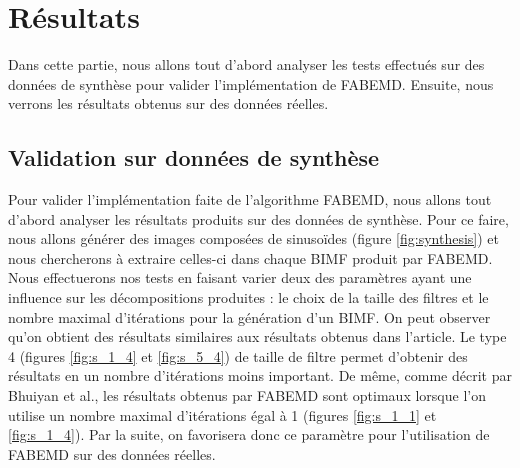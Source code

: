 \chapter{Résultats}
Dans cette partie, nous allons tout d'abord analyser les tests effectués sur des données de synthèse pour valider l'implémentation de FABEMD. Ensuite, nous verrons les résultats obtenus sur des données réelles.
\section{Validation sur données de synthèse}
Pour valider l'implémentation faite de l'algorithme FABEMD, nous allons tout d'abord analyser les résultats produits sur des données de synthèse. Pour ce faire, nous allons générer des images composées de sinusoïdes (figure \ref{fig:synthesis}) et nous chercherons à extraire celles-ci dans chaque BIMF produit par FABEMD. Nous effectuerons nos tests en faisant varier deux des paramètres ayant une influence sur les décompositions produites : le choix de la taille des filtres et le nombre maximal d'itérations pour la génération d'un BIMF.
On peut observer qu'on obtient des résultats similaires aux résultats obtenus dans l'article. Le type 4 (figures \ref{fig:s_1_4} et \ref{fig:s_5_4}) de taille de filtre permet d'obtenir des résultats en un nombre d'itérations moins important. De même, comme décrit par Bhuiyan et al., les résultats obtenus par FABEMD sont optimaux lorsque l'on utilise un nombre maximal d'itérations égal à 1 (figures \ref{fig:s_1_1} et \ref{fig:s_1_4}). Par la suite, on favorisera donc ce paramètre pour l'utilisation de FABEMD sur des données réelles.

